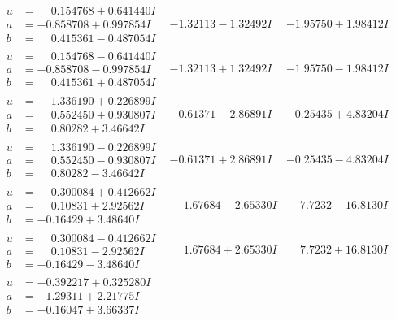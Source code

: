 \documentclass[1p]{elsarticle_modified}
\theoremstyle{definition}
\begin{document}
$$\begin{array}{c|c|c}
\begin{aligned}
u &= \phantom{-}0.154768 + 0.641440 I \\
a &= -0.858708 + 0.997854 I \\
b &= \phantom{-}0.415361 - 0.487054 I\end{aligned}
 & -1.32113 - 1.32492 I & -1.95750 + 1.98412 I \\ \hline\begin{aligned}
u &= \phantom{-}0.154768 - 0.641440 I \\
a &= -0.858708 - 0.997854 I \\
b &= \phantom{-}0.415361 + 0.487054 I\end{aligned}
 & -1.32113 + 1.32492 I & -1.95750 - 1.98412 I \\ \hline\begin{aligned}
u &= \phantom{-}1.336190 + 0.226899 I \\
a &= \phantom{-}0.552450 + 0.930807 I \\
b &= \phantom{-}0.80282 + 3.46642 I\end{aligned}
 & -0.61371 - 2.86891 I & -0.25435 + 4.83204 I \\ \hline\begin{aligned}
u &= \phantom{-}1.336190 - 0.226899 I \\
a &= \phantom{-}0.552450 - 0.930807 I \\
b &= \phantom{-}0.80282 - 3.46642 I\end{aligned}
 & -0.61371 + 2.86891 I & -0.25435 - 4.83204 I \\ \hline\begin{aligned}
u &= \phantom{-}0.300084 + 0.412662 I \\
a &= \phantom{-}0.10831 + 2.92562 I \\
b &= -0.16429 + 3.48640 I\end{aligned}
 & \phantom{-}1.67684 - 2.65330 I & \phantom{-}7.7232 - 16.8130 I \\ \hline\begin{aligned}
u &= \phantom{-}0.300084 - 0.412662 I \\
a &= \phantom{-}0.10831 - 2.92562 I \\
b &= -0.16429 - 3.48640 I\end{aligned}
 & \phantom{-}1.67684 + 2.65330 I & \phantom{-}7.7232 + 16.8130 I \\ \hline\begin{aligned}
u &= -0.392217 + 0.325280 I \\
a &= -1.29311 + 2.21775 I \\
b &= -0.16047 + 3.66337 I\end{aligned}

\end{array}$$
\end{document}
